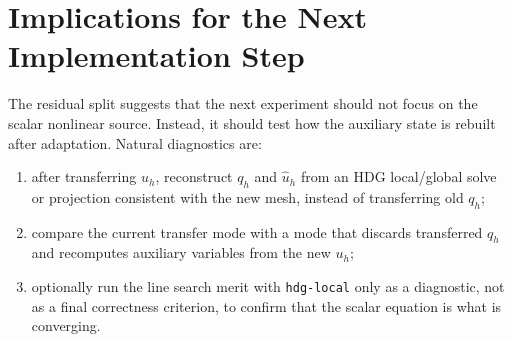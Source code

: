 \documentclass[11pt]{article}
\newcommand{\uhat}{\widehat u}
\begin{document}
\section{Implications for the Next Implementation Step}

The residual split suggests that the next experiment should not focus on
the scalar nonlinear source.  Instead, it should test how the auxiliary
state is rebuilt after adaptation.  Natural diagnostics are:
\begin{enumerate}[label=(\arabic*)]
  \item after transferring \(u_h\), reconstruct \(q_h\) and \(\uhat_h\)
  from an HDG local/global solve or projection consistent with the new
  mesh, instead of transferring old \(q_h\);
  \item compare the current transfer mode with a mode that discards
  transferred \(q_h\) and recomputes auxiliary variables from the new
  \(u_h\);
  \item optionally run the line search merit with \texttt{hdg-local}
  only as a diagnostic, not as a final correctness criterion, to confirm
  that the scalar equation is what is converging.
\end{enumerate}
\end{document}

